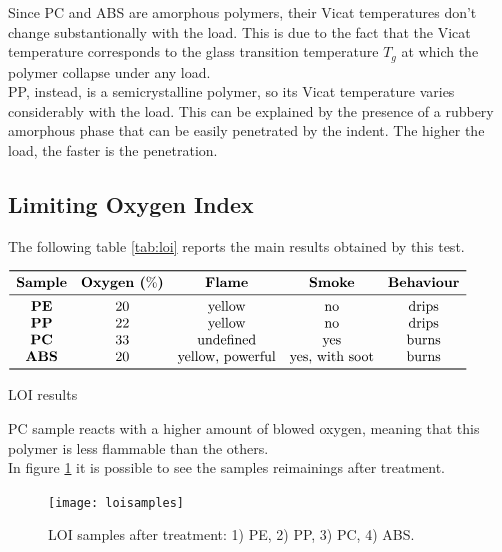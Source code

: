\documentclass[a4paper, 11pt]{article}
\begin{document}
Since PC and ABS are amorphous polymers, their Vicat temperatures don't change substantionally with the load. This is due to the fact that the Vicat temperature corresponds to the glass transition temperature $T_{g}$ at which the polymer collapse under any load.\\
PP, instead, is a semicrystalline polymer, so its Vicat temperature varies considerably with the load. This can be explained by the presence of a rubbery amorphous phase that can be easily penetrated by the indent. The higher the load, the faster is the penetration.

\subsection{Limiting Oxygen Index}

The following table \ref{tab:loi} reports the main results obtained by this test.
\begin{table}[htp]
	\centering
	$
	\begin{array}{ccccc}
	\toprule
	\textbf{Sample} & \textbf{Oxygen ($\%$)} & \textbf{Flame} & \textbf{Smoke} & \textbf{Behaviour} \\
	\midrule
	\textbf{PE} & 20 & \text{yellow} & \text{no} & \text{drips}\\
	\textbf{PP} & 22 & \text{yellow} & \text{no} & \text{drips}\\
	\textbf{PC} & 33 & \text{undefined} & \text{yes} & \text{burns}\\
	\textbf{ABS} & 20 & \text{yellow, powerful} & \text{yes, with soot} & \text{burns}\\
	\bottomrule
	\end{array}
	$
	\caption{LOI results}
	\label{tab:loi}
\end{table}

PC sample reacts with a higher amount of blowed oxygen, meaning that this polymer is less flammable than the others.\\
In figure \ref{fig:loisamples} it is possible to see the samples reimainings after treatment.

\begin{figure}[htp]
	\centering
	{\texttt{[image: loisamples]}}
	\captionsetup{justification=centering}
	\caption{LOI samples after treatment: 1) PE, 2) PP, 3) PC, 4) ABS.}
	\label{fig:loisamples}
\end{figure}
\end{document}
